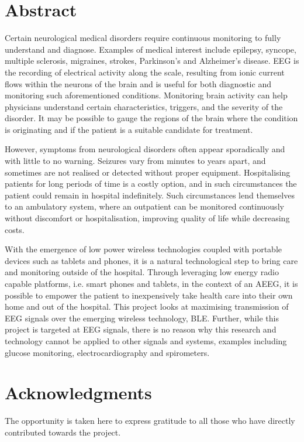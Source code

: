 \documentclass[]{article}
\begin{document}
\section*{Abstract}
Certain neurological medical disorders require continuous monitoring to fully understand and diagnose. Examples of medical interest include epilepsy, syncope, multiple sclerosis, migraines, strokes, Parkinson’s and Alzheimer’s disease. \ac{EEG} is the recording of electrical activity along the scale, resulting from ionic current flows within the neurons of the brain and is useful for both diagnostic and monitoring such aforementioned conditions. Monitoring brain activity can help physicians understand certain characteristics, triggers, and the severity of the disorder. It may be possible to gauge the regions of the brain where the condition is originating and if the patient is a suitable candidate for treatment. 

However, symptoms from neurological disorders often appear sporadically and with little to no warning. Seizures vary from minutes to years apart, and sometimes are not realised or detected without proper equipment. Hospitalising patients for long periods of time is a costly option, and in such circumstances the patient could remain in hospital indefinitely.  Such circumstances lend themselves to an ambulatory system, where an outpatient can be monitored continuously without discomfort or hospitalisation, improving quality of life while decreasing costs. 

With the emergence of low power wireless technologies coupled with portable devices such as tablets and phones, it is a natural technological step to bring care and monitoring outside of the hospital. Through leveraging low energy radio capable platforms, i.e. smart phones and tablets, in the context of an \ac{AEEG}, it is possible to empower the patient to inexpensively take health care into their own home and out of the hospital. This project looks at maximising transmission of \ac{EEG} signals over the emerging wireless technology, \ac{BLE}. Further, while this project is targeted at \ac{EEG} signals, there is no reason why this research and technology cannot be applied to other signals and systems, examples including glucose monitoring, electrocardiography and spirometers.


\clearpage
\tableofcontents
\clearpage

\section{Acknowledgments}
\label{sec:Acknowledgments}
The opportunity is taken here to express gratitude to all those who have directly contributed towards the project. 
\end{document}
